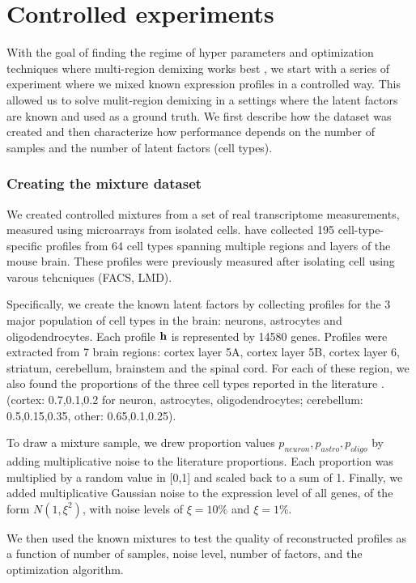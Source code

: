 
\section{Controlled experiments}
\label{Synthetic_exp}

With the goal of finding the regime of hyper parameters and optimization techniques where multi-region demixing works best , we start with a series of experiment where we mixed known expression profiles in a controlled way. This allowed us to solve mulit-region demixing in a settings where the latent factors are known and used as a ground truth. We first describe how the dataset was created and then characterize how performance depends on the number of samples and the number of latent factors (cell types).

\subsubsection*{Creating the mixture dataset}
We created controlled mixtures from a set of real transcriptome measurements, measured using microarrays from isolated cells. \citet{okaty2011cell} have collected 195 cell-type-specific profiles from 64 cell types spanning multiple regions and layers of the mouse brain. These profiles were previously measured after isolating cell using varous tehcniques (FACS, LMD).
 
Specifically, we create the known latent factors by collecting profiles for the 3 major population of cell types in the brain: neurons, astrocytes and oligodendrocytes. Each profile $\mathbf{h}$ is represented by 14580 genes. Profiles were extracted from 7 brain regions:  cortex layer 5A, cortex layer 5B, cortex layer 6, striatum, cerebellum, brainstem and the spinal cord. For each of these region, we also found the proportions of the three cell types reported in the literature \cite{Herculano2014}. (cortex:  0.7,0.1,0.2 for neuron, astrocytes, oligodendrocytes; cerebellum: 0.5,0.15,0.35, other: 0.65,0.1,0.25).

To draw a mixture sample, we drew proportion values $p_{neuron},p_{astro},p_{oligo}$ by adding multiplicative noise to the literature proportions. Each proportion was multiplied by a random value in [0,1] and scaled back to a  sum of 1. Finally, we added multiplicative Gaussian noise to the expression level of all genes, of the form $N(1,\xi^2)$, with noise levels of $\xi=10\%$ and $\xi=1\% $.

We then used the known mixtures to test the quality of reconstructed profiles as a function of number of samples, noise level, number of factors, and the optimization algorithm. 



